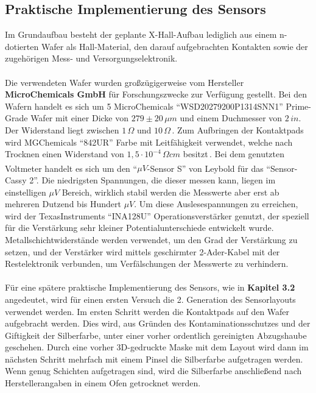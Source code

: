 \documentclass[12pt, a4paper]{article}
\begin{document}
\subsection{Praktische Implementierung des Sensors}
Im Grundaufbau besteht der geplante X-Hall-Aufbau lediglich aus einem n-dotierten Wafer als Hall-Material, den darauf aufgebrachten Kontakten sowie der zugehörigen Mess- und Versorgungselektronik.\paragraph{}
Die verwendeten Wafer wurden großzügigerweise vom Hersteller \textbf{MicroChemicals GmbH} für Forschungszwecke zur Verfügung gestellt.\newline
Bei den Wafern handelt es sich um 5 MicroChemicals ``WSD20279200P1314SNN1'' Prime-Grade Wafer mit einer Dicke von $279\pm20\,\mu{m}$ und einem Duchmesser von $2\,in$. Der Widerstand liegt zwischen $1\,\Omega$ und $10\,\Omega$\,\cite{mcChem}.\newline
Zum Aufbringen der Kontaktpads wird MGChemicals ``842UR'' Farbe mit Leitfähigkeit verwendet, welche nach Trocknen einen Widerstand von $1,5\cdot10^{-4}\,\Omega{cm}$ besitzt\,\cite{mgChem}.\newline
Bei dem genutzten Voltmeter handelt es sich um den ``$\mu{V}$-Sensor S'' von Leybold\textsuperscript{\textregistered} für das ``Sensor-Cassy 2''. Die niedrigsten Spannungen, die dieser messen kann, liegen im einstelligen $\mu{V}$ Bereich, wirklich stabil werden die Messwerte aber erst ab mehreren Dutzend bis Hundert $\mu{V}$.\newline
Um diese Auslesespannungen zu erreichen, wird der TexasInstruments ``INA128U'' Operationsverstärker genutzt, der speziell für die Verstärkung sehr kleiner Potentialunterschiede entwickelt wurde. Metallschichtwiderstände werden verwendet, um den Grad der Verstärkung zu setzen, und der Verstärker wird mittels geschirmter 2-Ader-Kabel mit der Restelektronik verbunden, um Verfälschungen der Messwerte zu verhindern.\paragraph{}
Für eine spätere praktische Implementierung des Sensors, wie in \textbf{Kapitel 3.2} angedeutet, wird für einen ersten Versuch die 2. Generation des Sensorlayouts verwendet werden.\newline
Im ersten Schritt werden die Kontaktpads auf den Wafer aufgebracht werden. Dies wird, aus Gründen des Kontaminationsschutzes und der Giftigkeit der Silberfarbe, unter einer vorher ordentlich gereinigten Abzugshaube geschehen. Durch eine vorher 3D-gedruckte Maske mit dem Layout wird dann im nächsten Schritt mehrfach mit einem Pinsel die Silberfarbe aufgetragen werden. Wenn genug Schichten aufgetragen sind, wird die Silberfarbe anschließend nach Herstellerangaben in einem Ofen getrocknet werden.\newline
\end{document}
